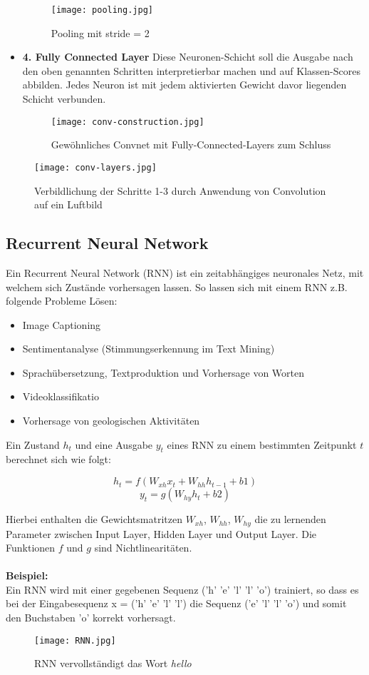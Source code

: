 \documentclass[11pt,ceqn]{book}
\begin{document}
\begin{itemize}
\begin{figure}[H]
\centering
\texttt{[image: pooling.jpg]}
\caption{Pooling mit stride = 2}
\end{figure}

\item \textbf{4. Fully Connected Layer} Diese Neuronen-Schicht soll die Ausgabe nach den oben genannten Schritten interpretierbar machen und auf Klassen-Scores abbilden. Jedes Neuron ist mit jedem aktivierten Gewicht davor liegenden Schicht verbunden.
\begin{figure}[H]
\centering
\texttt{[image: conv-construction.jpg]}
\caption{Gewöhnliches Convnet mit Fully-Connected-Layers zum Schluss}
\end{figure}

\end{itemize}

\begin{figure}[H]
\centering
\texttt{[image: conv-layers.jpg]}
\caption{Verbildlichung der Schritte 1-3 durch Anwendung von Convolution auf ein Luftbild\protect\footnotemark}
\end{figure}


\subsection{Recurrent Neural Network}
Ein Recurrent Neural Network (RNN) ist ein zeitabhängiges neuronales Netz, mit welchem sich Zustände vorhersagen lassen. So lassen sich mit einem RNN z.B. folgende Probleme Lösen:

\begin{itemize}
\item Image Captioning
\item Sentimentanalyse (Stimmungserkennung im Text Mining)
\item Sprachübersetzung, Textproduktion und Vorhersage von Worten
\item Videoklassifikatio
\item Vorhersage von geologischen Aktivitäten
\end{itemize}

Ein Zustand $h_t$ und eine Ausgabe $y_t$ eines RNN zu einem bestimmten Zeitpunkt $t$ berechnet sich wie folgt:

\[h_t = f(W_{xh} x_t + W_{hh} h_{t-1} + b1)\]
\[y_t = g(W_{hy} h_t + b2)\]

Hierbei enthalten die Gewichtsmatritzen $W_{xh}$, $W_{hh}$, $W_{hy}$ die zu lernenden Parameter zwischen Input Layer, Hidden Layer und Output Layer. Die Funktionen $f$ und $g$ sind Nichtlinearitäten.
\\~\\
\textbf{Beispiel:}\\
Ein RNN wird mit einer gegebenen Sequenz ('h' 'e' 'l' 'l' 'o') 
trainiert, so dass es bei der Eingabesequenz x = ('h' 'e' 'l' 'l') die Sequenz ('e' 'l' 'l' 'o') und somit den Buchstaben 'o' korrekt vorhersagt. 
\begin{figure}[H]
\centering
\texttt{[image: RNN.jpg]}
\caption{RNN vervollständigt das Wort \textit{hello}}
\end{figure}
\end{document}
